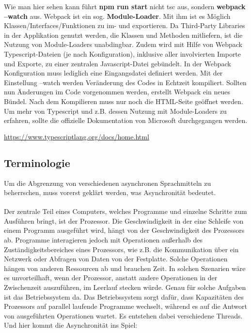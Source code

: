 \noindent
Wie man hier sehen kann führt \textbf{npm run start} nicht tsc aus, sondern \textbf{webpack --watch} aus. Webpack ist ein sog. \textbf{Module-Loader}. Mit ihm ist es Möglich Klassen/Interfaces/Funktionen zu im- und exportieren. Da Third-Party Libraries in der Applikation genutzt werden, die Klassen und Methoden mitliefern, ist die Nutzung von Module-Loaders unabdingbar. Zudem wird mit Hilfe von Webpack Typescript-Dateien (je nach Konfiguration), inklusive aller involvierten Importe und Exporte, zu einer zentralen Javascript-Datei gebündelt. In der Webpack Konfiguration muss lediglich eine Eingangsdatei definiert werden. Mit der Einstellung --watch werden Veränderung des Codes in Echtzeit kompiliert. Sollten nun Änderungen im Code vorgenommen werden, erstellt Webpack ein neues Bündel. Nach dem Kompilieren muss nur noch die HTML-Seite geöffnet werden. Um mehr von Typescript und z.B. dessen Nutzung mit Module-Loaders zu erfahren, sollte die offizielle Dokumentation von Microsoft durchgegangen werden.

\begin{center}
\url{https://www.typescriptlang.org/docs/home.html} 
\end{center}

\subsection{Terminologie}

Um die Abgrenzung von verschiedenen asynchronen Sprachmitteln zu beherrschen, muss vorerst geklärt werden, was Asynchronität bedeutet.\\\\

\noindent
Der zentrale Teil eines Computers, welches Programme und einzelne Schritte zum Ausführen bringt, ist der Prozessor. Die Geschwindigkeit in der eine Schleife von einem Programm ausgeführt wird, hängt von der Geschwindigkeit des Prozessors ab. Programme interagieren jedoch mit Operationen außerhalb des Zuständigkeitsbereiches eines Prozessors, wie z.B. die Kommunikation über ein Netzwerk oder Abfragen von Daten von der Festplatte. Solche Operationen hängen von anderen Ressourcen ab und brauchen Zeit. In solchen Szenarien wäre es unvorteilhaft, wenn der Prozessor, anstatt andere Operationen in der Zwischenzeit auszuführen, im Leerlauf stecken würde. Genau für solche Aufgaben ist das Betriebssystem da. Das Betriebssystem sorgt dafür, dass Kapazitäten des Prozessors auf parallel laufende Programme wechselt, während es auf die Antwort von ausgeführten Operationen wartet. Es entstehen dabei verschiedene \glqq Threads\grqq{}. Und hier kommt die Asynchronität ins Spiel:

